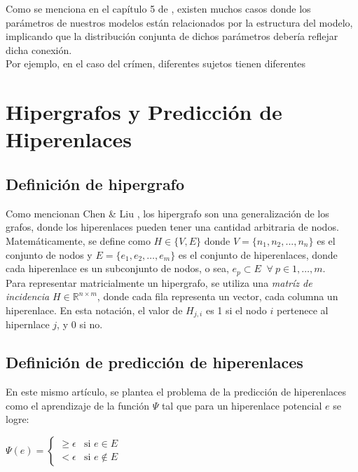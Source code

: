 Como se menciona en el capítulo 5 de \cite{gelman2013bayesian}, existen muchos casos donde los parámetros de nuestros modelos están relacionados por la estructura del modelo, implicando que la distribución conjunta de dichos parámetros debería reflejar dicha conexión.\\

Por ejemplo, en el caso del crímen, diferentes sujetos tienen diferentes 

\section{Hipergrafos y Predicción de Hiperenlaces}

\subsection{Definición de hipergrafo}

Como mencionan Chen \& Liu \cite{Chen_2024}, los hipergrafo son una generalización de los grafos, donde los hiperenlaces pueden tener una cantidad arbitraria de nodos.
Matemáticamente, se define como \begin{math} H \in \{V,E\}\end{math} donde $V=\{n_{1},n_{2},...,n_{n}\}$ es el conjunto de nodos y $E=\{e_{1},e_{2},\dots,e_{m}\}$ es el conjunto de hiperenlaces, donde cada hiperenlace es un subconjunto de nodos, o sea, $e_{p} \subset E \; \; \forall \: p \in 1,\dots,m$.\\

Para representar matricialmente un hipergrafo, se utiliza una \textit{matríz de incidencia} $H \in \mathbb{R}^{n \times m}$, donde cada fila representa un vector, cada columna un hiperenlace. En esta notación, el valor de $H_{j,i}$ es 1 si el nodo $i$ pertenece al hipernlace $j$, y 0 si no.\\


\subsection{Definición de predicción de hiperenlaces}
En este mismo artículo, se plantea el problema de la predicción de hiperenlaces como el aprendizaje de la función $\Psi $ tal que para un hiperenlace potencial $e$ se logre:

\begin{center}
    \begin{math}
        \Psi (e) = 
        \begin{cases}
            \geq \epsilon &\text{si $e \in E$}\\
            < \epsilon &\text{si $e \notin E$}
        \end{cases}
    \end{math}
\end{center}

